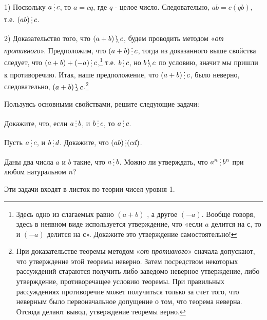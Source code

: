 
\begin{dok}
1) Поскольку $a\del c$, то $a = cq$, где $q$ - целое число. Следовательно, $ab = c(qb)$, т.е. $(ab)\del c$.

2) Доказательство того, что $(a + b)\ndel c$, будем проводить методом «\textit{от противного}». Предположим, что $(a + b)\del c$, тогда из доказанного выше свойства следует, что $(a + b) + (-a)\del c$,\footnote{Здесь одно из слагаемых равно $(a + b)$ , а другое $(-a)$. Вообще говоря, здесь в неявном виде используется утверждение, что «если $a$ делится на $с$, то и $(-a)$ делится на $с$». Докажите это утверждение самостоятельно!} т.е. $b\del c$, но $b \ndel c$ по условию, значит мы пришли к противоречию. Итак, наше предположение, что $(a + b)\del c$, было неверно,  следовательно, $(a + b) \ndel c$.\footnote{При доказательстве теоремы методом «\textit{от противного}» сначала допускают, что утверждение этой теоремы неверно. Затем посредством некоторых рассуждений стараются получить либо заведомо неверное утверждение, либо утверждение, противоречащее условию теоремы. При правильных рассуждениях противоречие может получиться только за счет того, что неверным было первоначальное допущение о том, что теорема неверна. Отсюда делают вывод, утверждение теоремы верно.}
\end{dok}

Пользуясь основными свойствами, решите следующие задачи:

\begin{thm}\label{4.1}
	Докажите, что, если $a\del b$, и $b\del c$, то $a\del c$.
\end{thm}

\begin{thm}\label{4.2}
	Пусть $a \del c$, и $b \del d$. Докажите, что $(ab) \del (cd)$.
\end{thm}

\begin{thm}\label{4.3}
	Даны два числа $a$ и $b$ такие, что $a\del b$. Можно ли утверждать, что $a^n\del b^n$ при любом натуральном $n$?
\end{thm}

\begin{prim}
    Эти задачи входят в листок по теории чисел уровня 1.
\end{prim}


